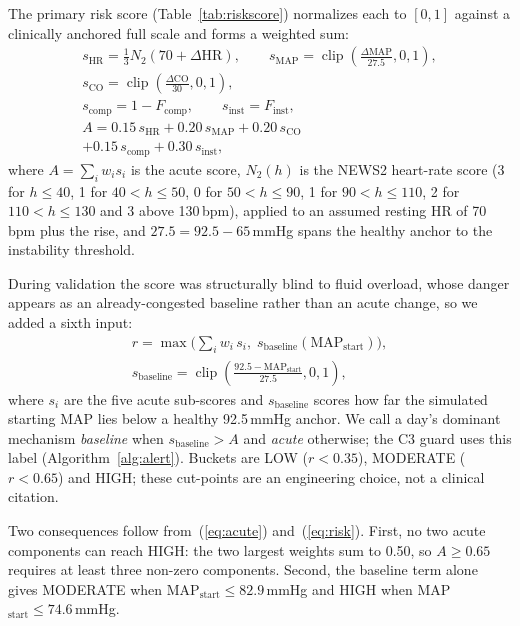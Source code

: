 \documentclass[conference]{IEEEtran}
\begin{document}
The primary risk score (Table~\ref{tab:riskscore}) normalizes each to $[0,1]$ against a clinically anchored full scale and forms a weighted sum:
\begin{equation}
\begin{gathered}
s_{\text{HR}}=\tfrac{1}{3}N_2(70+\Delta\text{HR}),\qquad s_{\text{MAP}}=\operatorname{clip}\!\left(\frac{\Delta\text{MAP}}{27.5},0,1\right),\\
s_{\text{CO}}=\operatorname{clip}\!\left(\frac{\Delta\text{CO}}{30},0,1\right),\\
s_{\text{comp}}=1-F_{\text{comp}},\qquad s_{\text{inst}}=F_{\text{inst}},\\
A=0.15\,s_{\text{HR}}+0.20\,s_{\text{MAP}}+0.20\,s_{\text{CO}}\\
+0.15\,s_{\text{comp}}+0.30\,s_{\text{inst}},
\end{gathered}
\label{eq:acute}
\end{equation}
where $A=\sum_i w_i s_i$ is the acute score, $N_2(h)$ is the NEWS2 heart-rate score \cite{rcp2017news2} (3 for $h\le40$, 1 for $40<h\le50$, 0 for $50<h\le90$, 1 for $90<h\le110$, 2 for $110<h\le130$ and 3 above 130\,bpm), applied to an assumed resting HR of 70\,bpm plus the rise, and $27.5=92.5-65$\,mmHg spans the healthy anchor to the instability threshold.

During validation the score was structurally blind to fluid overload, whose danger appears as an already-congested baseline rather than an acute change, so we added a sixth input:
\begin{equation}
\begin{gathered}
r=\max\big(\textstyle\sum_{i} w_i\, s_i,\; s_{\text{baseline}}(\text{MAP}_{\text{start}})\big),\\
s_{\text{baseline}}=\operatorname{clip}\!\left(\frac{92.5-\text{MAP}_{\text{start}}}{27.5},0,1\right),
\end{gathered}
\label{eq:risk}
\end{equation}
where $s_i$ are the five acute sub-scores and $s_{\text{baseline}}$ scores how far the simulated starting MAP lies below a healthy 92.5\,mmHg anchor. We call a day's dominant mechanism \emph{baseline} when $s_{\text{baseline}}>A$ and \emph{acute} otherwise; the C3 guard uses this label (Algorithm~\ref{alg:alert}). Buckets are LOW ($r<0.35$), MODERATE ($r<0.65$) and HIGH; these cut-points are an engineering choice, not a clinical citation.

Two consequences follow from~(\ref{eq:acute}) and~(\ref{eq:risk}). First, no two acute components can reach HIGH: the two largest weights sum to 0.50, so $A\ge0.65$ requires at least three non-zero components. Second, the baseline term alone gives MODERATE when MAP$_{\text{start}}\le82.9$\,mmHg and HIGH when MAP$_{\text{start}}\le74.6$\,mmHg.
\end{document}
